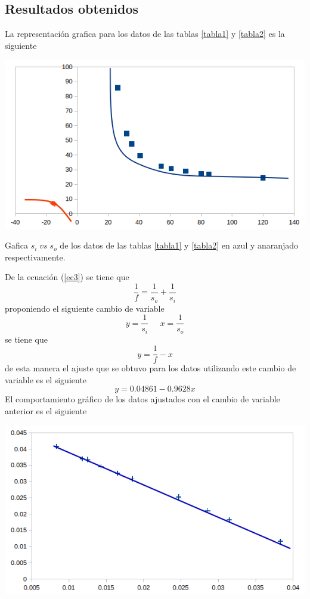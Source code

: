 \documentclass[13,twocolumn,letterpaper]{article}
\newenvironment{Figure}{\par\medskip\noindent\minipage{\linewidth}}{\endminipage\par\medskip}
\begin{document}
\begin{multicols}{2}
\pagebreak
\twocolumn
	\section*{Resultados obtenidos}
	{	
		La representación grafica para los datos de las tablas \ref{tabla1} y \ref{tabla2} es la siguiente
		\begin{Figure}
			\centering
			\includegraphics[width=\linewidth]{fig5}
			\caption{Gafica $s_{i}\;vs\;s_{o}$ de los datos de las tablas \ref{tabla1} y \ref{tabla2} en azul y anaranjado respectivamente.}
			}
			\label{fig:fig-5}
		\end{Figure}
		De la ecuación (\ref{ec3}) se tiene que 
		$$\dfrac{1}{f}=\dfrac{1}{s_{o}}+\dfrac{1}{s_{i}}$$
		proponiendo el siguiente cambio de variable 
		\begin{equation}\label{ec12}
			y=\dfrac{1}{s_{i}}\;\;\;\;\;x=\dfrac{1}{s_{o}}
		\end{equation}
		se tiene que 
		\begin{equation}\label{ec13}
			y=\dfrac{1}{f}-x
		\end{equation}
		de esta manera el ajuste que se obtuvo para los datos utilizando este cambio de variable es el siguiente 
		\begin{equation}\label{ec14}
			y=0.04861-0.9628x
		\end{equation}
		El comportamiento gráfico de los datos ajustados con el cambio de variable anterior es el siguiente  
		\begin{Figure}
			\centering
			\includegraphics[width=\linewidth]{fig6}

\end{Figure}
\end{multicols}
\end{document}
